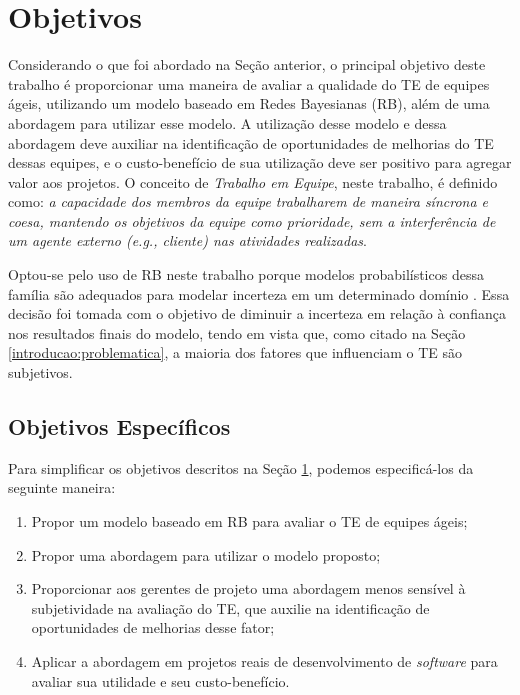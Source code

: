 \section{Objetivos}
\label{introducao:objetivos}

Considerando o que foi abordado na Seção anterior, o principal objetivo deste trabalho é proporcionar uma maneira de avaliar a qualidade do TE de equipes ágeis, utilizando um modelo baseado em Redes Bayesianas (RB), além de uma abordagem para utilizar esse modelo. A utilização desse modelo e dessa abordagem deve auxiliar na identificação de oportunidades de melhorias do TE dessas equipes, e o custo-benefício de sua utilização deve ser positivo para agregar valor aos projetos. O conceito de \textit{Trabalho em Equipe}, neste trabalho, é definido como: \textit{a capacidade dos membros da equipe trabalharem de maneira síncrona e coesa, mantendo os objetivos da equipe como prioridade, sem a interferência de um agente externo (e.g., cliente) nas atividades realizadas}.

Optou-se pelo uso de RB neste trabalho porque modelos probabilísticos dessa família são adequados para modelar incerteza em um determinado domínio \cite{bengal}. Essa decisão foi tomada com o objetivo de diminuir a incerteza em relação à confiança nos resultados finais do modelo, tendo em vista que, como citado na Seção \ref{introducao:problematica}, a maioria dos fatores que influenciam o TE são subjetivos.

\subsection{Objetivos Específicos}
\label{introducao:objetivos:especificos}

Para simplificar os objetivos descritos na Seção \ref{introducao:objetivos}, podemos especificá-los da seguinte maneira:

\begin{enumerate}
  \item Propor um modelo baseado em RB para avaliar o TE de equipes ágeis;
  \item Propor uma abordagem para utilizar o modelo proposto;
  \item Proporcionar aos gerentes de projeto uma abordagem menos sensível à subjetividade na avaliação do TE, que auxilie na identificação de oportunidades de melhorias desse fator;
  \item Aplicar a abordagem em projetos reais de desenvolvimento de \textit{software} para avaliar sua utilidade e seu custo-benefício.
\end{enumerate}

